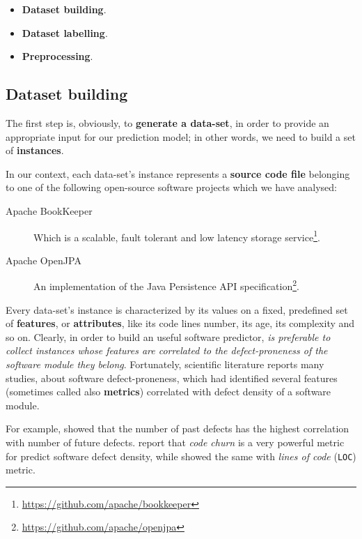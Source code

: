 \documentclass[sigconf]{acmart}
\begin{document}
\begin{itemize}
\item \textbf{Dataset building}.
\item \textbf{Dataset labelling}.
\item \textbf{Preprocessing}.
\end{itemize}


\subsection{Dataset building}

The first step is, obviously, to \textbf{generate a data-set}, in order to provide an appropriate input for our prediction model; in other words, we need to build a set of \textbf{instances}. 

In our context, each data-set's instance represents a \textbf{source code file} belonging to one of the following open-source software projects which we have analysed:

\begin{description}
\item[Apache BookKeeper\texttrademark]Which is a scalable, fault tolerant and low latency storage service\footnote{\url{https://github.com/apache/bookkeeper}}.
\item[Apache OpenJPA\texttrademark]An implementation of the Java Persistence API specification\footnote{\url{https://github.com/apache/openjpa}}. 
\end{description}

Every data-set's instance is characterized by its values on a fixed, predefined set of \textbf{features}, or \textbf{attributes}, like its code lines number, its age, its complexity and so on. Clearly, in order to build an useful software predictor, \textit{is preferable to collect instances whose features are correlated to the defect-proneness of the software module they belong}. Fortunately, scientific literature reports many studies, about software defect-proneness, which had identified several features (sometimes called also \textbf{metrics}) correlated with defect density of a software module. 

For example, \citet{PredictingDefectsForEclipse} showed that the number of past defects has the highest correlation with number of future defects. \citet{Nagappan} report that \textit{code churn} is a very powerful metric for predict software defect density, while \citet{Gyimothy} showed the same with \textit{lines of code} (\texttt{LOC}) metric.
\end{document}
